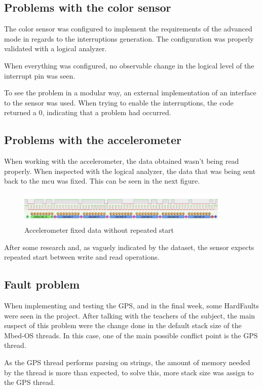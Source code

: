 \subsection{Problems with the color sensor}
The color sensor was configured to implement the requirements of the advanced mode in regards to the interruptions generation. The configuration was properly validated with a logical analyzer.

When everything was configured, no observable change in the logical level of the interrupt pin was seen.

To see the problem in a modular way, an external implementation\cite{TCS3472_I2CClasswhich} of an interface to the sensor was used. When trying to enable the interruptions, the code returned a 0, indicating that 
a problem had occurred.
\subsection{Problems with the accelerometer}
When working with the accelerometer, the data obtained wasn't being read properly. When inspected with the logical analyzer, the data that was being sent back to the \acrshort{mcu} was fixed. This can be seen in the next figure.
\begin{figure}[H]
    \centering
    \includegraphics[width=0.9\textwidth]{images/6/accProblem.png}
    \caption{Accelerometer fixed data without repeated start}
    \label{fig:accProblems}
\end{figure}
After some research and, as vaguely indicated by the dataset\cite{MMA8451Q1a}, the sensor expects repeated start between write and read operations.
\subsection{Fault problem}
When implementing and testing the GPS, and in the final week, some HardFaults were seen in the project. After talking with the teachers of the subject, the main suspect of this problem were 
the change done in the default stack size of the Mbed-OS threads. In this case, one of the main possible conflict point is the GPS thread.

As the GPS thread performs parsing on strings, the amount of memory needed by the thread is more than expected, to solve this, more stack size was assign to the GPS thread.